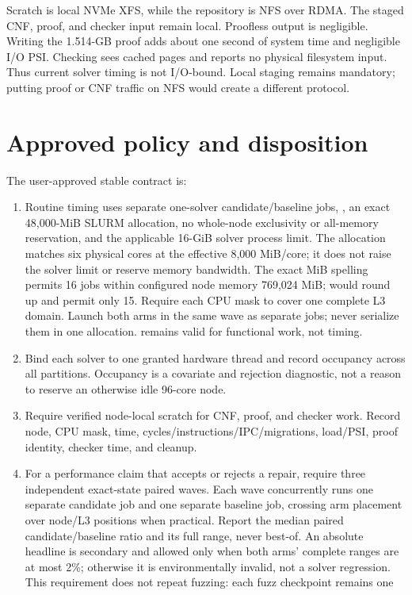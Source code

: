\documentclass[11pt]{article}
\newcommand{\code}[1]{\texttt{\detokenize{#1}}}
\begin{document}
Scratch is local NVMe XFS, while the repository is NFS over RDMA.  The staged
CNF, proof, and checker input remain local.  Proofless output is negligible.
Writing the 1.514-GB proof adds about one second of system time and negligible
I/O PSI.  Checking sees cached pages and reports no physical filesystem input.
Thus current solver timing is not I/O-bound.  Local staging remains mandatory;
putting proof or CNF traffic on NFS would create a different protocol.

\section{Approved policy and disposition}
The user-approved stable contract is:
\begin{enumerate}
\item Routine timing uses separate one-solver candidate/baseline jobs,
\code{-c 12}, an exact 48,000-MiB SLURM allocation, no whole-node exclusivity
or all-memory reservation, and the applicable 16-GiB solver process limit.  The allocation
matches six physical cores at the effective 8,000 MiB/core; it does not raise
the solver limit or reserve memory bandwidth.  The exact MiB spelling permits
16 jobs within configured node memory 769,024 MiB; \code{48G} would round up
and permit only 15.  Require each CPU mask to cover one complete L3
domain.  Launch both arms in the same wave as separate jobs; never serialize
them in one allocation.  \code{-c 4} remains valid for functional work, not
timing.
\item Bind each solver to one granted hardware thread and record occupancy
across all partitions.  Occupancy is a covariate and rejection diagnostic, not
a reason to reserve an otherwise idle 96-core node.
\item Require verified node-local scratch for CNF, proof, and checker work.
Record node, CPU mask, time, cycles/instructions/IPC/migrations, load/PSI,
proof identity, checker time, and cleanup.
\item For a performance claim that accepts or rejects a repair, require three
independent exact-state paired waves.  Each wave concurrently runs one separate
candidate job and one separate baseline job, crossing arm placement over
node/L3 positions when practical.  Report the median paired
candidate/baseline ratio and its full range, never best-of.  An absolute
headline is secondary and allowed only when both arms' complete ranges are at
most 2\%; otherwise it is environmentally invalid, not a solver regression.
This requirement does not repeat fuzzing: each fuzz checkpoint remains one

\end{enumerate}
\end{document}

